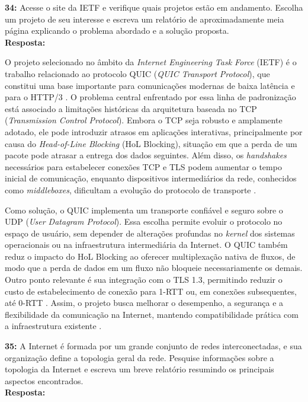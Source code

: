 \documentclass[12pt,a4paper]{report}
\begin{document}
\noindent \textbf{34:} Acesse o site da IETF e verifique quais projetos estão em andamento. Escolha um projeto de seu interesse e escreva um relatório de aproximadamente meia página explicando o problema abordado e a solução proposta. \\
\textbf{Resposta:}

O projeto selecionado no âmbito da \textit{Internet Engineering Task Force} (IETF) é o trabalho relacionado ao protocolo QUIC (\textit{QUIC Transport Protocol}), que constitui uma base importante para comunicações modernas de baixa latência e para o HTTP/3 \cite{rfc9114}. O problema central enfrentado por essa linha de padronização está associado a limitações históricas da arquitetura baseada no TCP (\textit{Transmission Control Protocol}). Embora o TCP seja robusto e amplamente adotado, ele pode introduzir atrasos em aplicações interativas, principalmente por causa do \textit{Head-of-Line Blocking} (HoL Blocking), situação em que a perda de um pacote pode atrasar a entrega dos dados seguintes. Além disso, os \textit{handshakes} necessários para estabelecer conexões TCP e TLS podem aumentar o tempo inicial de comunicação, enquanto dispositivos intermediários da rede, conhecidos como \textit{middleboxes}, dificultam a evolução do protocolo de transporte \cite{rfc9000}.

Como solução, o QUIC implementa um transporte confiável e seguro sobre o UDP (\textit{User Datagram Protocol}). Essa escolha permite evoluir o protocolo no espaço de usuário, sem depender de alterações profundas no \textit{kernel} dos sistemas operacionais ou na infraestrutura intermediária da Internet. O QUIC também reduz o impacto do HoL Blocking ao oferecer multiplexação nativa de fluxos, de modo que a perda de dados em um fluxo não bloqueie necessariamente os demais. Outro ponto relevante é sua integração com o TLS 1.3, permitindo reduzir o custo de estabelecimento de conexão para 1-RTT ou, em conexões subsequentes, até 0-RTT \cite{rfc9001}. Assim, o projeto busca melhorar o desempenho, a segurança e a flexibilidade da comunicação na Internet, mantendo compatibilidade prática com a infraestrutura existente \cite{ietf_quic_wg}.

\vspace{0.6cm}

\noindent \textbf{35:} A Internet é formada por um grande conjunto de redes interconectadas, e sua organização define a topologia geral da rede. Pesquise informações sobre a topologia da Internet e escreva um breve relatório resumindo os principais aspectos encontrados. \\
\textbf{Resposta:}
\end{document}
